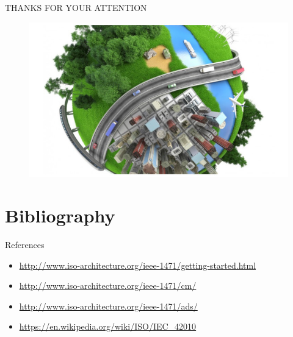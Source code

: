 		\begin{frame}
			\begin{LARGE}
			\begin{center}
			
				THANKS FOR YOUR ATTENTION

			\end{center}			
			\end{LARGE}
			\begin{figure}
						\begin{center}
							\includegraphics[width=\textwidth]{img/system-of-systems}
						\end{center}
					\end{figure}
		\end{frame}
		
		\section{Bibliography}
		
		\begin{frame}
			\begin{block}{References}
			
			\begin{itemize}
			\vspace{0.3cm}
				\item \url{http://www.iso-architecture.org/ieee-1471/getting-started.html}
			\vspace{0.3cm}
				\item \url{http://www.iso-architecture.org/ieee-1471/cm/}
			\vspace{0.3cm}
				\item \url{http://www.iso-architecture.org/ieee-1471/ads/}
			\vspace{0.3cm}
				\item \url{https://en.wikipedia.org/wiki/ISO/IEC_42010}
			\vspace{0.3cm}
			\end{itemize}

			\end{block}		
		\end{frame}
